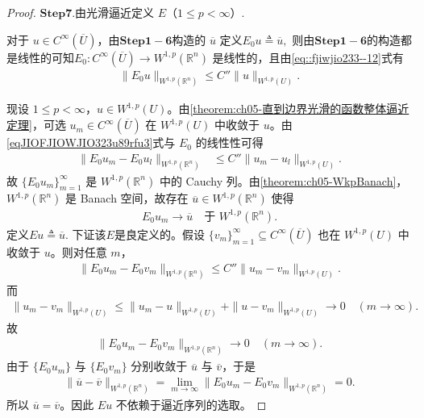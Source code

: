 \documentclass[../../main.tex]{subfiles}
\begin{document}
\begin{proof}
\noindent$\mathbf{Step}\bm{7}$.{\heiti 由光滑逼近定义 \(E\)（\(1\leqslant p<\infty\)）.}

对于 \(u\in C^{\infty}(\overline{U})\)，由$\mathbf{Step 1-6}$构造的 \(\overline{u}\) 定义$E_0 u\triangleq \overline{u},$
则由$\mathbf{Step 1-6}$的构造都是线性的可知\(E_0:C^{\infty}(\overline{U})\to W^{1,p}(\mathbb{R}^n)\) 是线性的，且由\eqref{eq::fjiwjio233--12}式有
\begin{align}\label{eqJIOFJIOWJIO323u89rfu3}
\|E_0 u\|_{W^{1,p}(\mathbb{R}^n)}\leqslant C''\|u\|_{W^{1,p}(U)}.
\end{align}

现设 \(1\leqslant p<\infty\)，\(u\in W^{1,p}(U)\)。由\cref{theorem:ch05-直到边界光滑的函数整体逼近定理}，可选 \(u_m\in C^{\infty}(\overline{U})\) 在 \(W^{1,p}(U)\) 中收敛于 \(u\)。由\eqref{eqJIOFJIOWJIO323u89rfu3}式与 \(E_0\) 的线性性可得
\begin{align*}
\|E_0 u_m-E_0 u_l\|_{W^{1,p}(\mathbb{R}^n)}
&\leqslant C''\|u_m-u_l\|_{W^{1,p}(U)}.
\end{align*}
故 \(\{E_0 u_m\}_{m=1}^{\infty}\) 是 \(W^{1,p}(\mathbb{R}^n)\) 中的 Cauchy 列。由\cref{theorem:ch05-WkpBanach}，\(W^{1,p}(\mathbb{R}^n)\) 是 Banach 空间，故存在 \(\overline{u}\in W^{1,p}(\mathbb{R}^n)\) 使得
\begin{align*}
E_0 u_m\to \overline{u}\quad \text{于 } W^{1,p}(\mathbb{R}^n).
\end{align*}
定义$E u\triangleq \overline{u}.$
下证该$E$是良定义的。假设 \(\{v_m\}_{m=1}^{\infty}\subseteq C^{\infty}(\overline{U})\) 也在 \(W^{1,p}(U)\) 中收敛于 \(u\)。则对任意 \(m\)，
\begin{align*}
\|E_0 u_m-E_0 v_m\|_{W^{1,p}(\mathbb{R}^n)}
\leqslant C''\|u_m-v_m\|_{W^{1,p}(U)}.
\end{align*}
而
\begin{align*}
\|u_m-v_m\|_{W^{1,p}(U)}
\leqslant \|u_m-u\|_{W^{1,p}(U)}+\|u-v_m\|_{W^{1,p}(U)}\to 0\quad (m\to\infty).
\end{align*}
故
\begin{align*}
\|E_0 u_m-E_0 v_m\|_{W^{1,p}(\mathbb{R}^n)}\to 0\quad (m\to\infty).
\end{align*}
由于 \(\{E_0 u_m\}\) 与 \(\{E_0 v_m\}\) 分别收敛于 \(\overline{u}\) 与 \(\overline{v}\)，于是
\begin{align*}
\|\overline{u}-\overline{v}\|_{W^{1,p}(\mathbb{R}^n)}
=\lim\limits_{m\to\infty}\|E_0 u_m-E_0 v_m\|_{W^{1,p}(\mathbb{R}^n)}=0.
\end{align*}
所以 \(\overline{u}=\overline{v}\)。因此 \(E u\) 不依赖于逼近序列的选取。


\end{proof}
\end{document}
